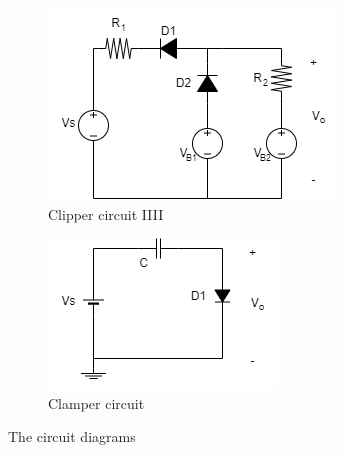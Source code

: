 \begin{figure}[H]
            \begin{subfigure}{0.4\textwidth}
                \includegraphics[width=1\linewidth]{Experiment_02/Circuits/Lab2c.png}
                \caption{Clipper circuit IIII}
                \label{cir:2c}
            \end{subfigure}
            \begin{subfigure}{0.4\textwidth}
                \includegraphics[width=1\linewidth]{Experiment_02/Circuits/Lab2d.png}
                \caption{Clamper circuit}
                \label{cir:2d}
            \end{subfigure}

            \caption{The circuit diagrams}
        \end{figure}

